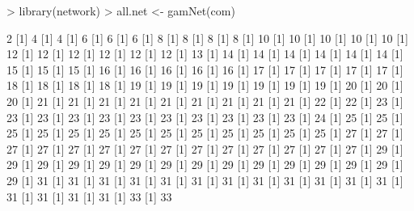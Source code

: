 \documentclass[12pt]{article}
\begin{document}
\begin{Schunk}
\begin{Sinput}
>   library(network)
> all.net <- gamNet(com)
\end{Sinput}
\begin{Soutput}
[1] 2%
[1] 4%
[1] 4%
[1] 6%
[1] 6%
[1] 6%
[1] 8%
[1] 8%
[1] 8%
[1] 8%
[1] 10%
[1] 10%
[1] 10%
[1] 10%
[1] 10%
[1] 12%
[1] 12%
[1] 12%
[1] 12%
[1] 12%
[1] 12%
[1] 13%
[1] 14%
[1] 14%
[1] 14%
[1] 14%
[1] 14%
[1] 14%
[1] 15%
[1] 15%
[1] 15%
[1] 16%
[1] 16%
[1] 16%
[1] 16%
[1] 16%
[1] 17%
[1] 17%
[1] 17%
[1] 17%
[1] 17%
[1] 18%
[1] 18%
[1] 18%
[1] 18%
[1] 19%
[1] 19%
[1] 19%
[1] 19%
[1] 19%
[1] 19%
[1] 19%
[1] 20%
[1] 20%
[1] 20%
[1] 21%
[1] 21%
[1] 21%
[1] 21%
[1] 21%
[1] 21%
[1] 21%
[1] 21%
[1] 21%
[1] 22%
[1] 22%
[1] 23%
[1] 23%
[1] 23%
[1] 23%
[1] 23%
[1] 23%
[1] 23%
[1] 23%
[1] 23%
[1] 23%
[1] 23%
[1] 24%
[1] 25%
[1] 25%
[1] 25%
[1] 25%
[1] 25%
[1] 25%
[1] 25%
[1] 25%
[1] 25%
[1] 25%
[1] 25%
[1] 25%
[1] 25%
[1] 27%
[1] 27%
[1] 27%
[1] 27%
[1] 27%
[1] 27%
[1] 27%
[1] 27%
[1] 27%
[1] 27%
[1] 27%
[1] 27%
[1] 27%
[1] 27%
[1] 29%
[1] 29%
[1] 29%
[1] 29%
[1] 29%
[1] 29%
[1] 29%
[1] 29%
[1] 29%
[1] 29%
[1] 29%
[1] 29%
[1] 29%
[1] 29%
[1] 29%
[1] 31%
[1] 31%
[1] 31%
[1] 31%
[1] 31%
[1] 31%
[1] 31%
[1] 31%
[1] 31%
[1] 31%
[1] 31%
[1] 31%
[1] 31%
[1] 31%
[1] 31%
[1] 31%
[1] 33%
[1] 33%

\end{Soutput}
\end{Schunk}
\end{document}
